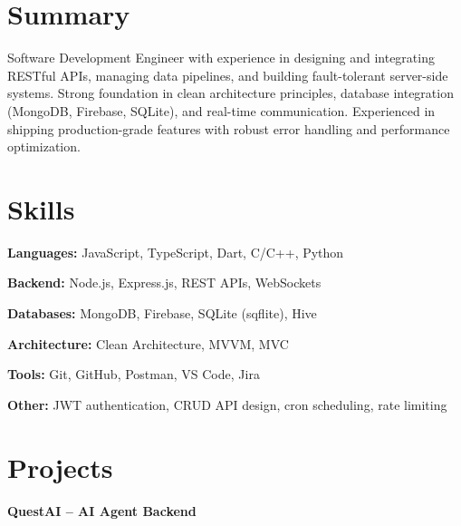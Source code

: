 \documentclass[letterpaper,10pt]{article}
\begin{document}


\section{Summary}
\resumeSubHeadingListStart
\item{}
Software Development Engineer with experience in designing and integrating RESTful APIs, managing data pipelines, and building fault-tolerant server-side systems. Strong foundation in clean architecture principles, database integration (MongoDB, Firebase, SQLite), and real-time communication. Experienced in shipping production-grade features with robust error handling and performance optimization.
\resumeSubHeadingListEnd

\section{Skills}
\begin{itemize}[leftmargin=0.15in, label={}, itemsep=0pt]
\small{
\item \textbf{Languages:} JavaScript, TypeScript, Dart, C/C++, Python
\item \textbf{Backend:} Node.js, Express.js, REST APIs, WebSockets
\item \textbf{Databases:} MongoDB, Firebase, SQLite (sqflite), Hive
\item \textbf{Architecture:} Clean Architecture, MVVM, MVC
\item \textbf{Tools:} Git, GitHub, Postman, VS Code, Jira
\item \textbf{Other:} JWT authentication, CRUD API design, cron scheduling, rate limiting
}
\end{itemize}



\section{Projects}
\resumeSubHeadingListStart

\resumeProjectHeading
{\textbf{QuestAI -- AI Agent Backend}}{}
\resumeItemListStart
{}
\resumeItemListEnd
\end{document}
